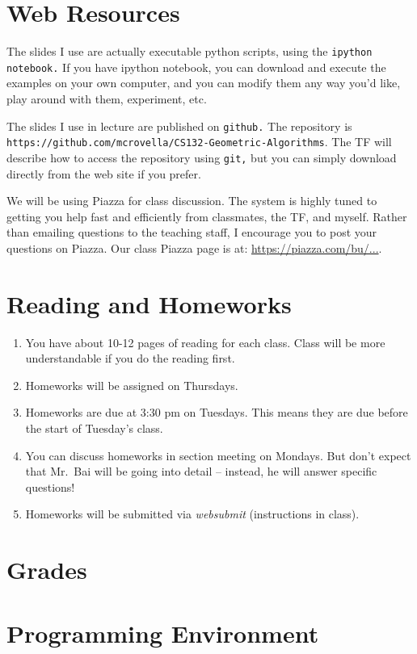 \documentclass[11pt]{article}
\begin{document}
\section*{Web Resources} 

The slides I use are actually executable python scripts, using the
\texttt{ipython notebook.}   If you have ipython notebook, you can
download and execute the examples on your own computer, and you can
modify them any way you'd like, play around with them, experiment, etc.

The slides I use in lecture are published on \texttt{github.}   The
repository is
\texttt{https://github.com/mcrovella/CS132-Geometric-Algorithms}.  The TF
will describe how to access the repository using \texttt{git,} but you
can simply download directly from the web site if you prefer.
 
We will be using Piazza for class discussion. The system is highly
tuned to getting you help fast and efficiently from classmates, the
TF, and myself. Rather than emailing questions to the teaching staff,
I encourage you to post your questions on Piazza.   Our class Piazza
page  is at: \url{https://piazza.com/bu/...}. 

\section*{Reading and Homeworks}

\begin{enumerate}
\item  You have about 10-12 pages of reading for each class.   Class will be
more understandable if you do the reading first.
\item  Homeworks will be assigned on Thursdays.
\item Homeworks are due at 3:30 pm on Tuesdays.  This means they are due
before the start of Tuesday's class.
\item You can discuss homeworks in section meeting on Mondays.   But don't
expect that Mr.\ Bai will be going into detail -- instead, he will
answer specific questions!
\item Homeworks will be submitted via \emph{websubmit} (instructions in class).
\end{enumerate}

\section*{Grades}

\section*{Programming Environment}
\end{document}
